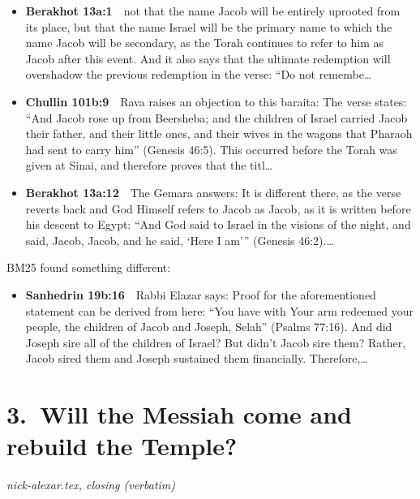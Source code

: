 \documentclass[11pt,a4paper]{article}
\begin{document}
\begin{itemize}[leftmargin=1.2em,itemsep=3pt]
\item {\color{ref}\textbf{Berakhot 13a:1}}\ \ not that the name Jacob will be entirely uprooted from its place, but that the name Israel will be the primary name to which the name Jacob will be secondary, as the Torah continues to refer to him as Jacob after this event. And it also says that the ultimate redemption will overshadow the previous redemption in the verse: “Do not remembe\ldots
\item {\color{ref}\textbf{Chullin 101b:9}}\ \ Rava raises an objection to this baraita: The verse states: “And Jacob rose up from Beersheba; and the children of Israel carried Jacob their father, and their little ones, and their wives in the wagons that Pharaoh had sent to carry him” (Genesis 46:5). This occurred before the Torah was given at Sinai, and therefore proves that the titl\ldots
\item {\color{ref}\textbf{Berakhot 13a:12}}\ \ The Gemara answers: It is different there, as the verse reverts back and God Himself refers to Jacob as Jacob, as it is written before his descent to Egypt: “And God said to Israel in the visions of the night, and said, Jacob, Jacob, and he said, ‘Here I am’” (Genesis 46:2).\ldots
\end{itemize}
{\color{quiet}\small BM25 found something different:}
\begin{itemize}[leftmargin=1.2em]
\item {\color{ref}\textbf{Sanhedrin 19b:16}}\ \ Rabbi Elazar says: Proof for the aforementioned statement can be derived from here: “You have with Your arm redeemed your people, the children of Jacob and Joseph, Selah” (Psalms 77:16). And did Joseph sire all of the children of Israel? But didn’t Jacob sire them? Rather, Jacob sired them and Joseph sustained them financially. Therefore,\ldots
\end{itemize}

\section*{3.\ Will the Messiah come and rebuild the Temple?}
{\color{quiet}\small\textit{nick-alexar.tex, closing (verbatim)}}
\end{document}
